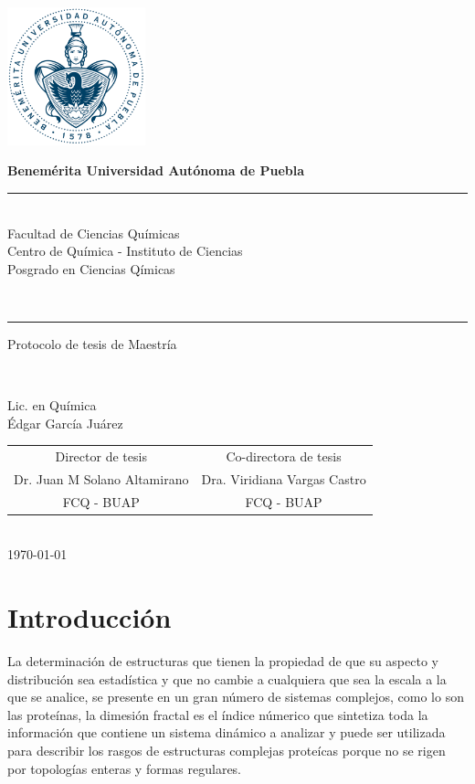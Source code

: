 \documentclass[11pt]{article}
\newcommand\vtab[1][0.5cm]{\vspace*{#1}}
\begin{document}
\pagestyle{empty} 
\phantom{a}
\vspace{-1.4cm}
\begin{center}
\includegraphics[width=4cm]{buap.pdf}

\Large{\textbf{Benemérita Universidad Autónoma de Puebla}\\
\rule{150mm}{0.1mm}\\
Facultad de Ciencias Químicas\\
Centro de Química - Instituto de Ciencias\\
Posgrado en Ciencias Qímicas}\\
\rule{150mm}{0.1mm}

\vtab[.1cm]
\Large{Protocolo de tesis de Maestría}\\
\vtab[0.2cm]

\large{\textbf{}}\\
\vtab[0.2cm]

Lic. en Química \\
Édgar García Juárez \\
\vtab[0.5cm]
\begin{tabular}{cc}
\vtab[10mm]
Director de tesis & Co-directora de tesis \\
Dr. Juan M Solano Altamirano & Dra. Viridiana Vargas Castro \\ 
FCQ - BUAP & FCQ - BUAP \\ 
\end{tabular} 
\vtab[1cm] \\
{\today}
\end{center}

\clearpage

\section{Introducción}

La determinación de estructuras que tienen la propiedad de que su aspecto y distribución sea estadística y que no cambie a cualquiera que sea la escala a la que se analice, se presente en un gran número de sistemas complejos, como lo son las proteínas, la dimesión fractal es el índice númerico que sintetiza toda la información que contiene un sistema dinámico a analizar y puede ser utilizada para describir los rasgos de estructuras  complejas proteícas porque no se rigen por topologías enteras y formas regulares. 
\end{document}
